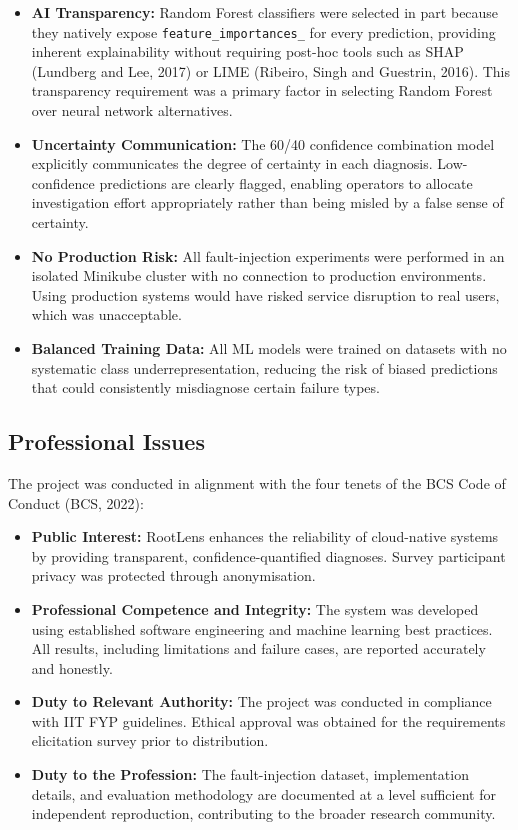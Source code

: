 \begin{itemize}
    \item \textbf{AI Transparency:} Random Forest classifiers were selected in part because they natively expose \texttt{feature\_importances\_} for every prediction, providing inherent explainability without requiring post-hoc tools such as SHAP (Lundberg and Lee, 2017) or LIME (Ribeiro, Singh and Guestrin, 2016). This transparency requirement was a primary factor in selecting Random Forest over neural network alternatives.
    \item \textbf{Uncertainty Communication:} The 60/40 confidence combination model explicitly communicates the degree of certainty in each diagnosis. Low-confidence predictions are clearly flagged, enabling operators to allocate investigation effort appropriately rather than being misled by a false sense of certainty.
    \item \textbf{No Production Risk:} All fault-injection experiments were performed in an isolated Minikube cluster with no connection to production environments. Using production systems would have risked service disruption to real users, which was unacceptable.
    \item \textbf{Balanced Training Data:} All ML models were trained on datasets with no systematic class underrepresentation, reducing the risk of biased predictions that could consistently misdiagnose certain failure types.
\end{itemize}

\subsection{Professional Issues}
The project was conducted in alignment with the four tenets of the BCS Code of Conduct (BCS, 2022):

\begin{itemize}
    \item \textbf{Public Interest:} RootLens enhances the reliability of cloud-native systems by providing transparent, confidence-quantified diagnoses. Survey participant privacy was protected through anonymisation.
    \item \textbf{Professional Competence and Integrity:} The system was developed using established software engineering and machine learning best practices. All results, including limitations and failure cases, are reported accurately and honestly.
    \item \textbf{Duty to Relevant Authority:} The project was conducted in compliance with IIT FYP guidelines. Ethical approval was obtained for the requirements elicitation survey prior to distribution.
    \item \textbf{Duty to the Profession:} The fault-injection dataset, implementation details, and evaluation methodology are documented at a level sufficient for independent reproduction, contributing to the broader research community.
\end{itemize}

